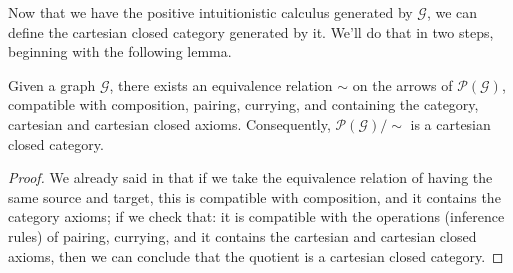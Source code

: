 Now that we have the positive intuitionistic calculus generated by $\mathcal G$, we can define the cartesian closed category generated by it. We'll do that in two steps, beginning with the following lemma.

\begin{lemma}\label{lem:ccc-quotient-existence}
Given a graph $\mathcal G$, there exists an equivalence relation $\sim$ on the
arrows of $\mathcal P(\mathcal G)$, compatible with composition,
pairing, currying, and containing the category, cartesian and
cartesian closed axioms. Consequently,
$\mathcal P(\mathcal G)/{\sim}$ is a cartesian closed category.
\end{lemma}

\begin{proof}
    We already said in  that if we take the equivalence relation of having the same source and target, 
    this is compatible with composition, and it contains the category axioms; if we check that: it is compatible with the operations (inference rules) of
    pairing, currying, and it contains the cartesian and cartesian closed axioms, then we can conclude that the quotient is a cartesian closed category.


\end{proof}
